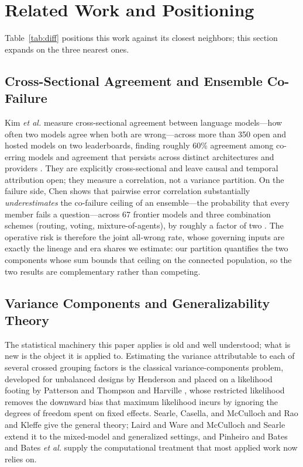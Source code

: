 \documentclass{ieeeaccess}
\theoremstyle{definition}
\theoremstyle{plain}
\begin{document}
\section{Related Work and Positioning}
\label{sec:related}
Table~\ref{tab:diff} positions this work against its closest neighbors; this
section expands on the three nearest ones.

\subsection{Cross-Sectional Agreement and Ensemble Co-Failure}
Kim \emph{et al.} measure cross-sectional agreement between language models---how
often two models agree when both are wrong---across more than 350 open and hosted
models on two leaderboards, finding roughly 60\% agreement among co-erring models
and agreement that persists across distinct architectures and providers
\cite{kim2025}. They are explicitly cross-sectional and leave causal and temporal
attribution open; they measure a correlation, not a variance partition. On the
failure side, Chen shows that pairwise error correlation substantially
\emph{underestimates} the co-failure ceiling of an ensemble---the probability that
every member fails a question---across 67 frontier models and three combination
schemes (routing, voting, mixture-of-agents), by roughly a factor of two
\cite{chen2026}. The operative risk is therefore the joint all-wrong rate, whose
governing inputs are exactly the lineage and era shares we estimate: our partition
quantifies the two components whose sum bounds that ceiling on the connected
population, so the two results are complementary rather than competing.

\subsection{Variance Components and Generalizability Theory}
The statistical machinery this paper applies is old and well understood; what
is new is the object it is applied to. Estimating the variance attributable to
each of several crossed grouping factors is the classical variance-components
problem, developed for unbalanced designs by Henderson \cite{henderson1975} and
placed on a likelihood footing by Patterson and Thompson
\cite{patterson1971} and Harville \cite{harville1977}, whose restricted
likelihood removes the downward bias that maximum likelihood incurs by ignoring
the degrees of freedom spent on fixed effects. Searle, Casella, and McCulloch
\cite{searle1992} and Rao and Kleffe \cite{rao1988} give the general theory;
Laird and Ware \cite{laird1982} and McCulloch and Searle \cite{mcculloch2001}
extend it to the mixed-model and generalized settings, and Pinheiro and Bates
\cite{pinheiro2000} and Bates \emph{et al.} \cite{bates2015} supply the
computational treatment that most applied work now relies on.
\end{document}
